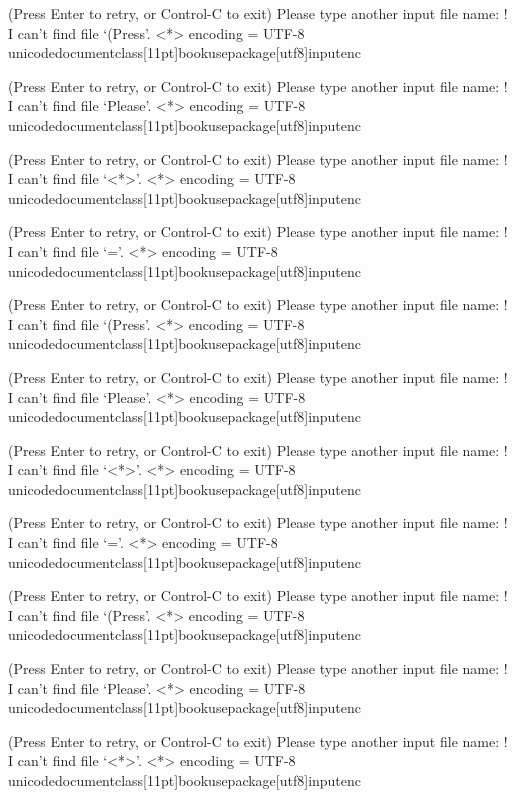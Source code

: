 (Press Enter to retry, or Control-C to exit)
Please type another input file name: ! I can't find file `(Press'.
<*> encoding 
             = UTF-8 unicodedocumentclass[11pt]{book}usepackage[utf8]{inputenc}

(Press Enter to retry, or Control-C to exit)
Please type another input file name: ! I can't find file `Please'.
<*> encoding 
             = UTF-8 unicodedocumentclass[11pt]{book}usepackage[utf8]{inputenc}

(Press Enter to retry, or Control-C to exit)
Please type another input file name: ! I can't find file `<*>'.
<*> encoding 
             = UTF-8 unicodedocumentclass[11pt]{book}usepackage[utf8]{inputenc}

(Press Enter to retry, or Control-C to exit)
Please type another input file name: ! I can't find file `='.
<*> encoding 
             = UTF-8 unicodedocumentclass[11pt]{book}usepackage[utf8]{inputenc}

(Press Enter to retry, or Control-C to exit)
Please type another input file name: ! I can't find file `(Press'.
<*> encoding 
             = UTF-8 unicodedocumentclass[11pt]{book}usepackage[utf8]{inputenc}

(Press Enter to retry, or Control-C to exit)
Please type another input file name: ! I can't find file `Please'.
<*> encoding 
             = UTF-8 unicodedocumentclass[11pt]{book}usepackage[utf8]{inputenc}

(Press Enter to retry, or Control-C to exit)
Please type another input file name: ! I can't find file `<*>'.
<*> encoding 
             = UTF-8 unicodedocumentclass[11pt]{book}usepackage[utf8]{inputenc}

(Press Enter to retry, or Control-C to exit)
Please type another input file name: ! I can't find file `='.
<*> encoding 
             = UTF-8 unicodedocumentclass[11pt]{book}usepackage[utf8]{inputenc}

(Press Enter to retry, or Control-C to exit)
Please type another input file name: ! I can't find file `(Press'.
<*> encoding 
             = UTF-8 unicodedocumentclass[11pt]{book}usepackage[utf8]{inputenc}

(Press Enter to retry, or Control-C to exit)
Please type another input file name: ! I can't find file `Please'.
<*> encoding 
             = UTF-8 unicodedocumentclass[11pt]{book}usepackage[utf8]{inputenc}

(Press Enter to retry, or Control-C to exit)
Please type another input file name: ! I can't find file `<*>'.
<*> encoding 
             = UTF-8 unicodedocumentclass[11pt]{book}usepackage[utf8]{inputenc}


